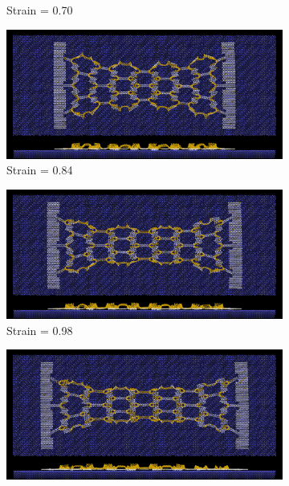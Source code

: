 \begin{figure}[H]
\begin{subfigure}[b]{0.49\textwidth}
        \caption{Strain = 0.70}
    \end{subfigure}
    \begin{subfigure}[b]{0.49\textwidth}
        \centering
        \includegraphics[width=\textwidth]{figures/baseline/contact_vs_stretch/honeycomb/hon_stretch0084.png}
        \caption{Strain = 0.84}
    \end{subfigure}
    \hfill
    \begin{subfigure}[b]{0.49\textwidth}
        \centering
        \includegraphics[width=\textwidth]{figures/baseline/contact_vs_stretch/honeycomb/hon_stretch0098.png}
        \caption{Strain = 0.98}
    \end{subfigure}
    \begin{subfigure}[b]{0.49\textwidth}
        \centering
        \includegraphics[width=\textwidth]{figures/baseline/contact_vs_stretch/honeycomb/hon_stretch0112.png}

\end{subfigure}
\end{figure}
